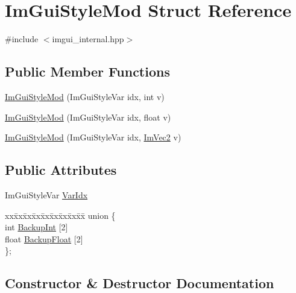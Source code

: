 \hypertarget{struct_im_gui_style_mod}{}\section{Im\+Gui\+Style\+Mod Struct Reference}
\label{struct_im_gui_style_mod}


{\ttfamily \#include $<$imgui\+\_\+internal.\+hpp$>$}

\subsection*{Public Member Functions}
\begin{DoxyCompactItemize}
\item 
\hyperlink{struct_im_gui_style_mod_ae9987273b247f021020034256364bec8}{Im\+Gui\+Style\+Mod} (Im\+Gui\+Style\+Var idx, int v)
\item 
\hyperlink{struct_im_gui_style_mod_a737c3fad802a8d5d4616f9decc7e402d}{Im\+Gui\+Style\+Mod} (Im\+Gui\+Style\+Var idx, float v)
\item 
\hyperlink{struct_im_gui_style_mod_a28647cc4ab8b95b8ee30e0fc7401ae07}{Im\+Gui\+Style\+Mod} (Im\+Gui\+Style\+Var idx, \hyperlink{struct_im_vec2}{Im\+Vec2} v)
\end{DoxyCompactItemize}
\subsection*{Public Attributes}
\begin{DoxyCompactItemize}
\item 
Im\+Gui\+Style\+Var \hyperlink{struct_im_gui_style_mod_ab23c55941dbd0e156ce640a8fecb2feb}{Var\+Idx}
\item 
\begin{tabbing}
xx\=xx\=xx\=xx\=xx\=xx\=xx\=xx\=xx\=\kill
union \{\\
\>int \hyperlink{struct_im_gui_style_mod_a60491c95989b2a866ebb76403a562f6f}{BackupInt} \mbox{[}2\mbox{]}\\
\>float \hyperlink{struct_im_gui_style_mod_af36b5cf1100de970d78a53db937be949}{BackupFloat} \mbox{[}2\mbox{]}\\
\}; \\

\end{tabbing}\end{DoxyCompactItemize}


\subsection{Constructor \& Destructor Documentation}
\hypertarget{struct_im_gui_style_mod_ae9987273b247f021020034256364bec8}{}\label{struct_im_gui_style_mod_ae9987273b247f021020034256364bec8} 
